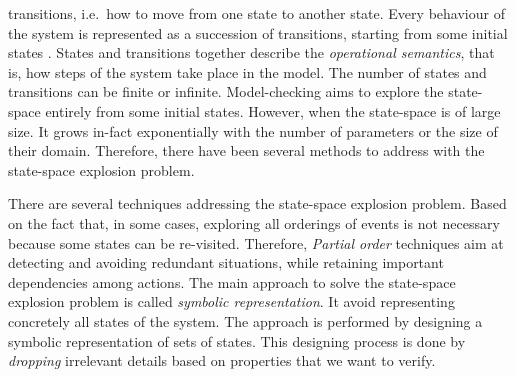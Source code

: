 transitions, i.e.\ how to move from one state to another state. Every behaviour of the system is represented as a succession of transitions, starting from some initial states .
States and transitions together describe the \emph{operational
  semantics}, that is, how steps of the system take place in the model.
The number of states and transitions can be finite or infinite.
Model-checking aims to explore the state-space entirely from some initial states.
 However, when the state-space is of large size. It grows in-fact
exponentially with the number of parameters or the size of their
domain. Therefore, there have been several methods to address with  the
state-space explosion problem.

                   
There are several techniques addressing the state-space explosion problem.
Based on the fact that, in some cases, exploring all orderings of events is not necessary because some states can be re-visited. Therefore, \emph{Partial order} techniques aim at detecting and avoiding
redundant situations, while retaining important dependencies among
actions. The main approach to solve the state-space explosion problem is
called  \emph{symbolic
  representation}. It avoid  representing concretely all states of the system.
The approach is performed by designing a symbolic representation of sets of states.
This designing process is done by \emph{dropping} irrelevant details based on properties that we want to verify.

